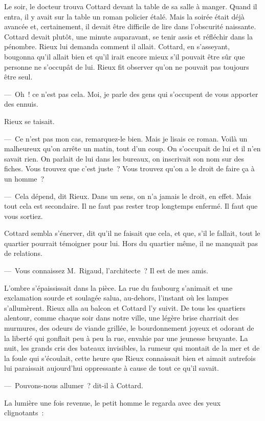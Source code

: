 \documentclass[french,twoside]{book} %
\begin{document}
Le soir, le docteur trouva Cottard devant la table de sa salle à manger. Quand il entra, il y avait sur la table un roman policier étalé. Mais la soirée était déjà avancée et, certainement, il devait être difficile de lire dans l’obscurité naissante. Cottard devait plutôt, une minute auparavant, se tenir assis et réfléchir dans la pénombre. Rieux lui demanda comment il allait. Cottard, en s’asseyant, bougonna qu’il allait bien et qu’il irait encore mieux s’il pouvait être sûr que personne ne s’occupât de lui. Rieux fit observer qu’on ne pouvait pas toujours être seul.\par
— Oh ! ce n’est pas cela. Moi, je parle des gens qui s’occupent de vous apporter des ennuis.\par
Rieux se taisait.\par
— Ce n’est pas mon cas, remarquez-le bien. Mais je lisais ce roman. Voilà un malheureux qu’on arrête un matin, tout d’un coup. On s’occupait de lui et il n’en savait rien. On parlait de lui dans les bureaux, on inscrivait son nom sur des fiches. Vous trouvez que c’est juste ? Vous trouvez qu’on a le droit de faire ça à un homme ?\par
— Cela dépend, dit Rieux. Dans un sens, on n’a jamais le droit, en effet. Mais tout cela est secondaire. Il ne faut pas rester trop longtemps enfermé. Il faut que vous sortiez.\par
Cottard sembla s’énerver, dit qu’il ne faisait que cela, et que, s’il le fallait, tout le quartier pourrait témoigner pour lui. Hors du quartier même, il ne manquait pas de relations.\par
— Vous connaissez M. Rigaud, l’architecte ? Il est de mes amis.\par
L’ombre s’épaississait dans la pièce. La rue du faubourg s’animait et une exclamation sourde et soulagée salua, au-dehors, l’instant où les lampes s’allumèrent. Rieux alla au balcon et Cottard l’y suivit. De tous les quartiers alentour, comme chaque soir dans notre ville, une légère brise charriait des murmures, des odeurs de viande grillée, le bourdonnement joyeux et odorant de la liberté qui gonflait peu à peu la rue, envahie par une jeunesse bruyante. La nuit, les grands cris des bateaux invisibles, la rumeur qui montait de la mer et de la foule qui s’écoulait, cette heure que Rieux connaissait bien et aimait autrefois lui paraissait aujourd’hui oppressante à cause de tout ce qu’il savait.\par
— Pouvons-nous allumer ? dit-il à Cottard.\par
La lumière une fois revenue, le petit homme le regarda avec des yeux clignotants :\par
\end{document}
